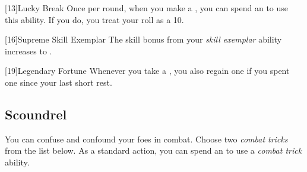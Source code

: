         [13]{Lucky Break} Once per round, when you make a , you can spend an  to use this ability.
        If you do, you treat your roll as a 10.

        [16]{Supreme Skill Exemplar} The skill bonus from your \textit{skill exemplar} ability increases to .

        [19]{Legendary Fortune} Whenever you take a , you also regain one  if you spent one since your last short rest.

    \subsection{Scoundrel}

        You can confuse and confound your foes in combat.
        Choose two \textit{combat tricks} from the list below.
        As a standard action, you can spend an  to use a \textit{combat trick} ability.
